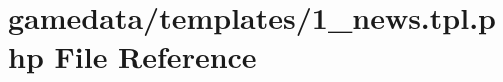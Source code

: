 \hypertarget{1__news_8tpl_8php}{\section{gamedata/templates/1\+\_\+news.tpl.\+php File Reference}
\label{1__news_8tpl_8php}
}

